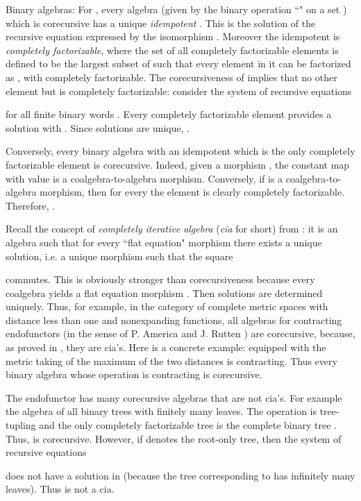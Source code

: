 \documentclass{LMCS}
\theoremstyle{plain}
\theoremstyle{definition}
\numberwithin{equation}{section}
\begin{document}
\begin{exa}
  \label{ex:binary}
Binary algebras: For , every algebra  (given by the binary operation ``" on a set ) which is corecursive has a unique {\it idempotent} . This is the solution of the recursive equation 
expressed by the isomorphism . Moreover the idempotent is {\it completely factorizable}, where
the set of all completely factorizable elements is defined to be the largest subset of  such that every element  in it can be factorized as , with  completely factorizable. The corecursiveness of  implies  that no other element but  is completely factorizable: consider the system of recursive equations

for all finite binary words . Every completely factorizable element  provides a solution  with . Since solutions are unique, .

Conversely, every binary algebra  with an idempotent  which is the only completely factorizable element is corecursive. Indeed, given a morphism , the constant map  with value  is a coalgebra-to-algebra morphism. Conversely, if  is a coalgebra-to-algebra morphism, then for every  the element  is clearly completely factorizable. Therefore, .
\end{exa}

\begin{rem}\label{cia}
Recall the concept of {\it completely iterative algebra} ({\it cia} for short) from \cite{m_cia}: it is an algebra  such that for every ``flat equation" morphism  there exists a unique solution, i.e. a unique morphism  such that the square
 
commutes. This is obviously stronger than corecursiveness because every coalgebra  yields a flat equation morphism . Then solutions are determined uniquely. Thus, for example, in the category of complete metric spaces with distance less than one and nonexpanding functions, all algebras for contracting endofunctors (in the sense of P. America and J. Rutten \cite{america+rutten}) are corecursive, because, as proved in \cite{m_cia}, they are cia's. Here is a concrete example:  equipped with the metric taking  of the maximum of the two distances is contracting. Thus every binary algebra whose operation is contracting is corecursive.
\end{rem}

\begin{exa}
The endofunctor  has many corecursive algebras that are not cia's. For example the algebra  of all binary trees with finitely many leaves. The operation is tree-tupling and the only completely factorizable tree is the complete binary tree . Thus,  is corecursive. However, if  denotes the root-only tree, then the system of recursive equations

does not have a solution in  (because the tree corresponding to  has infinitely many leaves). Thus  is not a cia.
\end{exa}
\end{document}
